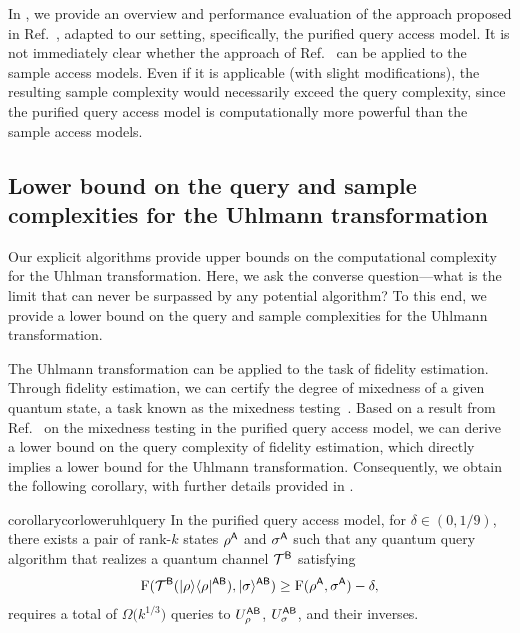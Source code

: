 In , we provide an overview and performance evaluation of the approach proposed in Ref.~\cite{metger2023stateqipspace}, adapted to our setting, specifically, the purified query access model.
It is not immediately clear whether the approach of Ref.~\cite{metger2023stateqipspace} can be applied to the sample access models.
Even if it is applicable (with slight modifications), the resulting sample complexity would necessarily exceed the query complexity, since the purified query access model is computationally more powerful than the sample access models.







\subsection{Lower bound on the query and sample complexities for the Uhlmann transformation}
\label{sec:overview of lower bound}

Our explicit algorithms provide upper bounds on the computational complexity for the Uhlman transformation.
Here, we ask the converse question---what is the limit that can never be surpassed by any potential algorithm? 
To this end, we provide a lower bound on the query and sample complexities for the Uhlmann transformation.

The Uhlmann transformation can be applied to the task of fidelity estimation. Through fidelity estimation, we can certify the degree of mixedness of a given quantum state, a task known as the mixedness testing~\cite{ODonnell2021SpectrumTesting, MdW16surveyquantproptest, Wright2016howtolearnQS}.
Based on a result from Ref.~\cite{Liu2025EstimationTrace} on the mixedness testing in the purified query access model, we can derive a lower bound on the query complexity of fidelity estimation, which directly implies a lower bound for the Uhlmann transformation.
Consequently, we obtain the following corollary, with further details provided in .



\begin{restatable}{corollary}{corloweruhlquery}
\label{cor:lower Uhlmann query}
In the purified query access model, for $\delta \in (0, 1/9)$, there exists a pair of rank-$k$ states $\rho^{\mathsf{A}}$ and $\sigma^{\mathsf{A}}$ such that any quantum query algorithm that realizes a quantum channel ${\mathcal{T}}^{{\mathsf{B}}}$ satisfying
\begin{align}
    {\mathrm{F}}({\mathcal{T}}^{\mathsf{B}}(|\rho\rangle\langle\rho|^{{\mathsf{A}}{\mathsf{B}}}), |\sigma\rangle^{{\mathsf{A}}{\mathsf{B}}}) \geq {\mathrm{F}}(\rho^{\mathsf{A}}, \sigma^{\mathsf{A}}) - \delta,
\end{align}
requires a total of $\Omega\big(k^{1/3}\big)$ queries to $U_\rho^{{\mathsf{A}}{\mathsf{B}}}$, $U_\sigma^{{\mathsf{A}}{\mathsf{B}}}$, and their inverses.
\end{restatable}


